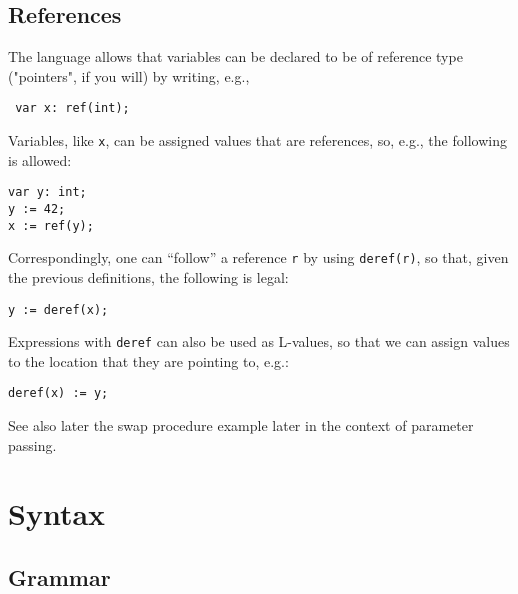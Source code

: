 \documentclass[11pt]{article}
\begin{document}
\subsection{References}
\label{sec:org3c7ca27}

The language allows that variables can be declared to be of reference type
("pointers", if you will) by writing, e.g., 


\lstset{language=compila,label= ,caption= ,captionpos=b,numbers=none}
\begin{lstlisting}
 var x: ref(int);
\end{lstlisting}


Variables,  like \texttt{x},  can be assigned values that are references, so, e.g.,
the following is allowed:

\lstset{language=compila,label= ,caption= ,captionpos=b,numbers=none}
\begin{lstlisting}
var y: int;
y := 42;
x := ref(y);
\end{lstlisting}

Correspondingly, one can ``follow'' a reference \texttt{r} by using \texttt{deref(r)}, so
that, given the previous definitions, the following is legal:

\lstset{language=compila,label= ,caption= ,captionpos=b,numbers=none}
\begin{lstlisting}
y := deref(x);
\end{lstlisting}

Expressions with \texttt{deref} can also be used as L-values, so that we can
assign values to the location that they are pointing to, e.g.:


\lstset{language=compila,label= ,caption= ,captionpos=b,numbers=none}
\begin{lstlisting}
deref(x) := y;
\end{lstlisting}


See also later the swap procedure example later in the context of parameter
passing.





\section{Syntax}
\label{sec:org0d2adb2}

\subsection{Grammar}
\label{sec:orgaccb58f}
\end{document}
